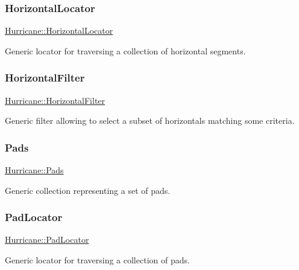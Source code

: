\subsubsection{\texorpdfstring{Horizontal\+Locator}{HorizontalLocator}}
{\footnotesize\ttfamily \mbox{\hyperlink{namespaceHurricane_a7f4e07165be3dfcec8786e88370bdb67}{Hurricane\+::\+Horizontal\+Locator}}}

Generic locator for traversing a collection of horizontal segments. \mbox{\label{namespaceHurricane_a56eb48037c2e1295fafe761bf179bf01}} 
\subsubsection{\texorpdfstring{Horizontal\+Filter}{HorizontalFilter}}
{\footnotesize\ttfamily \mbox{\hyperlink{namespaceHurricane_a56eb48037c2e1295fafe761bf179bf01}{Hurricane\+::\+Horizontal\+Filter}}}

Generic filter allowing to select a subset of horizontals matching some criteria. \mbox{\label{namespaceHurricane_abd1f433c44d8b515e1b8a8810aea1610}} 
\subsubsection{\texorpdfstring{Pads}{Pads}}
{\footnotesize\ttfamily \mbox{\hyperlink{namespaceHurricane_abd1f433c44d8b515e1b8a8810aea1610}{Hurricane\+::\+Pads}}}

Generic collection representing a set of pads. \mbox{\label{namespaceHurricane_a733c2eb75cde14a8b6a2e62edfbd2792}} 
\subsubsection{\texorpdfstring{Pad\+Locator}{PadLocator}}
{\footnotesize\ttfamily \mbox{\hyperlink{namespaceHurricane_a733c2eb75cde14a8b6a2e62edfbd2792}{Hurricane\+::\+Pad\+Locator}}}

Generic locator for traversing a collection of pads. \mbox{\label{namespaceHurricane_aeff6d8148675fc30f366906bfc652c25}} 
